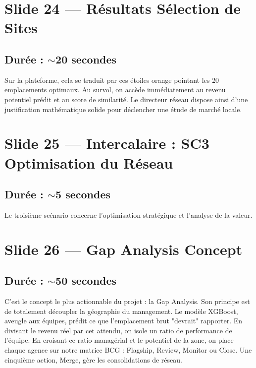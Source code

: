 \documentclass[11pt,a4paper]{article}
\begin{document}
\section{Slide 24 --- Résultats Sélection de Sites}
\subsection{Durée : $\sim$20 secondes}
Sur la plateforme, cela se traduit par ces étoiles orange pointant les 20 emplacements optimaux. Au survol, on accède immédiatement au revenu potentiel prédit et au score de similarité. Le directeur réseau dispose ainsi d'une justification mathématique solide pour déclencher une étude de marché locale.

\section{Slide 25 --- Intercalaire : SC3 Optimisation du Réseau}
\subsection{Durée : $\sim$5 secondes}
Le troisième scénario concerne l'optimisation stratégique et l'analyse de la valeur.

\section{Slide 26 --- Gap Analysis Concept}
\subsection{Durée : $\sim$50 secondes}
C'est le concept le plus actionnable du projet : la Gap Analysis. Son principe est de totalement découpler la géographie du management. 
Le modèle XGBoost, aveugle aux équipes, prédit ce que l'emplacement brut "devrait" rapporter. En divisant le revenu réel par cet attendu, on isole un ratio de performance de l'équipe. En croisant ce ratio managérial et le potentiel de la zone, on place chaque agence sur notre matrice BCG : Flagship, Review, Monitor ou Close. Une cinquième action, Merge, gère les consolidations de réseau.
\end{document}
